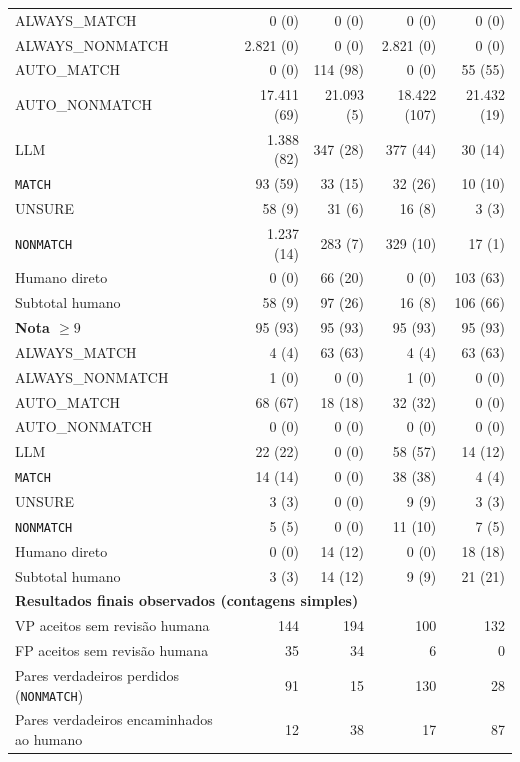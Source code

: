 \begin{longtable}{lrrrr}
\quad ALWAYS\_MATCH & 0 (0) & 0 (0) & 0 (0) & 0 (0) \\
\quad ALWAYS\_NONMATCH & 2.821 (0) & 0 (0) & 2.821 (0) & 0 (0) \\
\quad AUTO\_MATCH & 0 (0) & 114 (98) & 0 (0) & 55 (55) \\
\quad AUTO\_NONMATCH & 17.411 (69) & 21.093 (5) & 18.422 (107) & 21.432 (19) \\
\quad LLM & 1.388 (82) & 347 (28) & 377 (44) & 30 (14) \\
\qquad \texttt{MATCH} & 93 (59) & 33 (15) & 32 (26) & 10 (10) \\
\qquad UNSURE & 58 (9) & 31 (6) & 16 (8) & 3 (3) \\
\qquad \texttt{NONMATCH} & 1.237 (14) & 283 (7) & 329 (10) & 17 (1) \\
\quad Humano direto & 0 (0) & 66 (20) & 0 (0) & 103 (63) \\
Subtotal humano & 58 (9) & 97 (26) & 16 (8) & 106 (66) \\
\hline
\textbf{Nota $\geq9$} & 95 (93) & 95 (93) & 95 (93) & 95 (93) \\
\quad ALWAYS\_MATCH & 4 (4) & 63 (63) & 4 (4) & 63 (63) \\
\quad ALWAYS\_NONMATCH & 1 (0) & 0 (0) & 1 (0) & 0 (0) \\
\quad AUTO\_MATCH & 68 (67) & 18 (18) & 32 (32) & 0 (0) \\
\quad AUTO\_NONMATCH & 0 (0) & 0 (0) & 0 (0) & 0 (0) \\
\quad LLM & 22 (22) & 0 (0) & 58 (57) & 14 (12) \\
\qquad \texttt{MATCH} & 14 (14) & 0 (0) & 38 (38) & 4 (4) \\
\qquad UNSURE & 3 (3) & 0 (0) & 9 (9) & 3 (3) \\
\qquad \texttt{NONMATCH} & 5 (5) & 0 (0) & 11 (10) & 7 (5) \\
\quad Humano direto & 0 (0) & 14 (12) & 0 (0) & 18 (18) \\
Subtotal humano & 3 (3) & 14 (12) & 9 (9) & 21 (21) \\
\hline
\multicolumn{5}{l}{\textbf{Resultados finais observados (contagens simples)}} \\
VP aceitos sem revisão humana & 144 & 194 & 100 & 132 \\
FP aceitos sem revisão humana & 35 & 34 & 6 & 0 \\
Pares verdadeiros perdidos (\texttt{NONMATCH}) & 91 & 15 & 130 & 28 \\
Pares verdadeiros encaminhados ao humano & 12 & 38 & 17 & 87 \\

\end{longtable}
